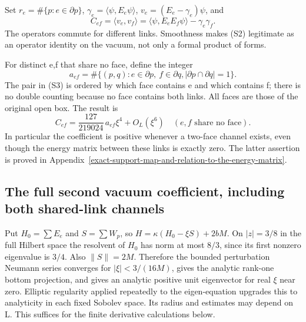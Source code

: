 Set \(r_e=\#\{p:e\in\partial p\}\), \(\gamma_e=\langle\psi,E_e\psi\rangle\), \(v_e=(E_e-\gamma_e)\psi\), and \[
 C_{ef}=\langle v_e,v_f\rangle
   =\langle\psi,E_eE_f\psi\rangle-\gamma_e\gamma_f.
\tag{S2}
\] The operators commute for different links. Smoothness makes (S2) legitimate as an operator identity on the vacuum, not only a formal product of forms.

For distinct e,f that share no face, define the integer \[
 a_{ef}=\#\{(p,q): e\in\partial p,\ f\in\partial q,
                     |\partial p\cap\partial q|=1\}.
\tag{S3}
\] The pair in (S3) is ordered by which face contains e and which contains f; there is no double counting because no face contains both links. All faces are those of the original open box. The result is \[
 \boxed{C_{ef}=\frac{127}{219024}\,a_{ef}\xi^4+O_L(\xi^6)
        \quad(e,f\text{ share no face}).}
\tag{S4}
\] In particular the coefficient is positive whenever a two-face channel exists, even though the energy matrix between these links is exactly zero. The latter assertion is proved in Appendix~\ref{exact-support-map-and-relation-to-the-energy-matrix}.

\subsection{The full second vacuum coefficient, including both shared-link channels}\label{the-full-second-vacuum-coefficient-including-both-shared-link-channels}

Put \(H_0=\sum E_e\) and \(S=\sum W_p\), so \(H=\kappa(H_0-\xi S)+2bM\). On \(|z|=3/8\) in the full Hilbert space the resolvent of \(H_0\) has norm at most \(8/3\), since its first nonzero eigenvalue is \(3/4\). Also \(\|S\|=2M\). Therefore the bounded perturbation Neumann series converges for \(|\xi|<3/(16M)\), gives the analytic rank-one bottom projection, and gives an analytic positive unit eigenvector for real \(\xi\) near zero. Elliptic regularity applied repeatedly to the eigen-equation upgrades this to analyticity in each fixed Sobolev space. Its radius and estimates may depend on L. This suffices for the finite derivative calculations below.

